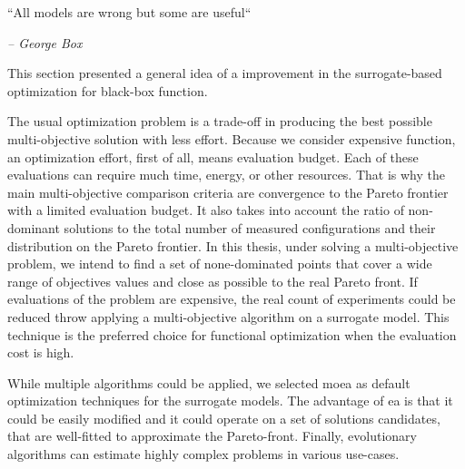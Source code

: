 
    \epigraph{``All models are wrong but some are useful``}{\textit{– George Box}}

    This section presented a general idea of a improvement in the surrogate-based optimization for black-box function. 

    The usual optimization problem is a trade-off in producing the best possible multi-objective solution with less effort. Because we consider expensive function, an optimization effort, first of all, means evaluation budget. Each of these evaluations can require much time, energy, or other resources. That is why the main multi-objective comparison criteria are convergence to the Pareto frontier with a limited evaluation budget. It also takes into account the ratio of non-dominant solutions to the total number of measured configurations and their distribution on the Pareto frontier. In this thesis, under solving a multi-objective problem, we intend to find a set of none-dominated points that cover a wide range of objectives values and close as possible to the real Pareto front. If evaluations of the problem are expensive, the real count of experiments could be reduced throw applying a multi-objective algorithm on a surrogate model. This technique is the preferred choice for functional optimization when the evaluation cost is high.

    While multiple algorithms could be applied, we selected \gls{moea} as default optimization techniques for the surrogate models. The advantage of \gls{ea} is that it could be easily modified and it could operate on a set of solutions candidates, that are well-fitted to approximate the Pareto-front. Finally, evolutionary algorithms can estimate highly complex problems in various use-cases.





